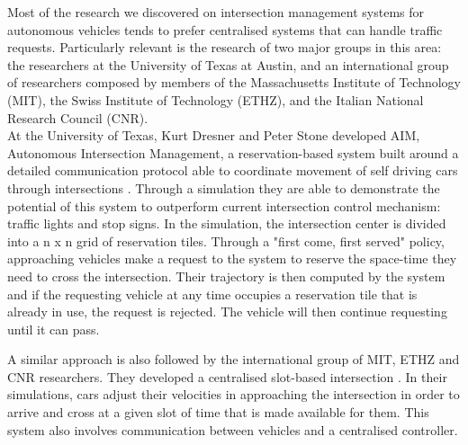 Most of the research we discovered on intersection management systems for autonomous vehicles tends to prefer centralised systems that can handle traffic requests.
Particularly relevant is the research of two major groups in this area: the researchers at the University of Texas at Austin, and an international group of researchers composed by members of the Massachusetts Institute of Technology (MIT), the Swiss Institute of Technology (ETHZ), and the Italian National Research Council (CNR).\\

At the University of Texas, Kurt Dresner and Peter Stone developed AIM, Autonomous Intersection Management, a reservation-based system built around a detailed communication protocol able to coordinate movement of self driving cars through intersections \cite{texas}.
Through a simulation they are able to demonstrate the potential of this system to outperform current intersection control mechanism: traffic lights and stop signs.
In the simulation, the intersection center is divided into a n x n grid of reservation tiles.
Through a "first come, first served" policy, approaching vehicles make a request to the system to reserve the space-time they need to cross the intersection. 
Their trajectory is then computed by the system and if the requesting vehicle at any time occupies a reservation tile that is already in use, the request is rejected.
The vehicle will then continue requesting until it can pass.

A similar approach is also followed by the international group of MIT, ETHZ and CNR researchers.
They developed a centralised slot-based intersection \cite{mit}.
In their simulations, cars adjust their velocities in approaching the intersection in order to arrive and cross at a given slot of time that is made available for them.
This system also involves communication between vehicles and a centralised controller.